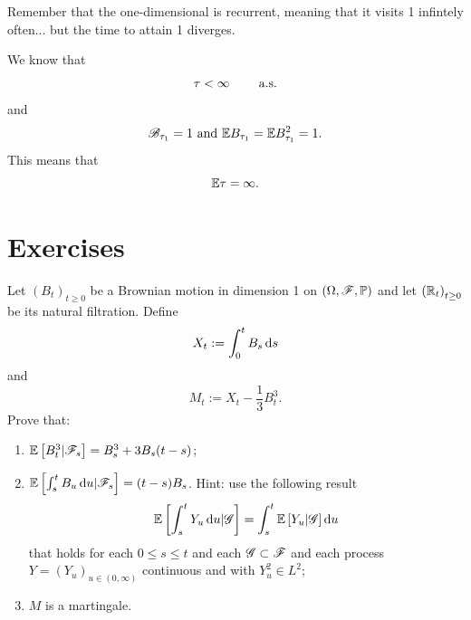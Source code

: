 \documentclass[12pt]{report}
\begin{document}
Remember that the one-dimensional \bwm{} is recurrent, meaning that it visits 1 infintely often... but the time to attain 1 diverges. \begin{fancyproof}
	We know that 
\begin{equation*}
	\tau<\infty\qquad\text{ a.s.}{}
\end{equation*}
and
\begin{equation*}
	\mathscr{B}_{\tau_{1}}=1\text{ and }\mathbb{E} B_{\tau_{1}}=\mathbb{E} B^{2}_{\tau_{1}}=1.
\end{equation*}
This means that
\begin{equation*}
	\mathbb{E}{\tau}=\infty.
\end{equation*}
\end{fancyproof}
\section*{Exercises}
\label{sec:exer2}
\begin{exercise}
	Let ${(B_{t})}_{t\geq 0}$ be a Brownian motion in dimension 1 on $(\Omega,\mathscr{F},\mathbb{P})$ and let ${(\mathbb{R}_{t})}_{t\geq 0}$ be its natural filtration. Define
	\begin{equation*}
		X_{t}:=\int_{0}^{t}B_{s}\mathop{}\!\mathrm{d} s
	\end{equation*}
	and
	\begin{equation*}
		M_{t}:=X_{t}-\frac{1}{3}B_{t}^{3}.
	\end{equation*}
	Prove that:
	\begin{enumerate}
		\item $\mathbb{E}\left[B^{3}_{t}|\mathscr{F}_{s}\right]=B^{3}_{s}+3B_{s}(t-s)$;
		\item $\mathbb{E}\left[\int_{s}^{t}B_{u}\mathop{}\!\mathrm{d} u|\mathscr{F}_{s}\right]=(t-s)B_{s}$. Hint: use the following result
		\begin{equation*}
			\mathbb{E}\left[\int_{s}^{t} Y_{u}\mathop{}\!\mathrm{d} u|\mathscr{G}\right]=\int_{s}^{t}\mathbb{E}\left[Y_{u}|\mathscr{G}\right]\mathop{}\!\mathrm{d} u
		\end{equation*}
		that holds for each $0\leq s\leq t$ and each \sa{} $\mathscr{G}\subset\mathscr{F}$ and each process $Y={(Y_{u})}_{u\in(0,\infty)}$ continuous and with $Y_{u}^{2}\in L^{2}$;
		\item $M$ is a martingale.
	\end{enumerate}
\end{exercise}
\end{document}
